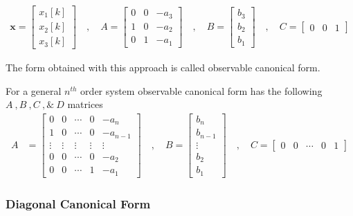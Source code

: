 \documentclass[twoside]{article}
\begin{document}
\begin{align*}
\mathbf{x} = \left[ \begin{array}{c} x_1[k] \\ x_2[k] \\
x_3[k] \end{array} \right] \quad , \quad
A = \left[ \begin{array}{ccc} 0 & 0 & -a_3 \\ 1 & 0 & -a_2
    \\ 0 & 1 & -a_1 \end{array} \right]
\quad , \quad 
B = \left[ \begin{array}{c} b_3 \\ b_2 
    \\ b_1  \end{array} \right]
\quad , \quad
C = \left[ \begin{array}{ccc} 0 & 0 & 1 \end{array} \right]
\end{align*}
%

The form obtained with this approach is called
observable canonical form. 

For a general $n^{th}$ order system observable
canonical form has the following $A \ ,  B \ ,  C \ , \& \ D$
matrices
%
\begin{align*}
A &= \left[ \begin{array}{ccccc} 0 & 0 & \cdots & 0 & -a_{n} 
              \\ 1 & 0 & \cdots & 0 & -a_{n-1} 
\\ \vdots & \vdots & \vdots & \vdots & \vdots
\\ 0 & 0 & \cdots & 0 & -a_2
    \\ 0 & 0 & \cdots & 1 & -a_1 \end{array} \right]
\quad , \quad 
B = \left[ \begin{array}{c} b_n  \\ b_{n-1} \\ \vdots \\ b_2 \\   b_1 
\end{array} \right] \quad , \quad 
C = \left[ \begin{array}{ccccc} 0 & 0 & \cdots &  0 & 1 \end{array} \right]
\end{align*}
%
\subsubsection*{Diagonal Canonical Form}
\end{document}
